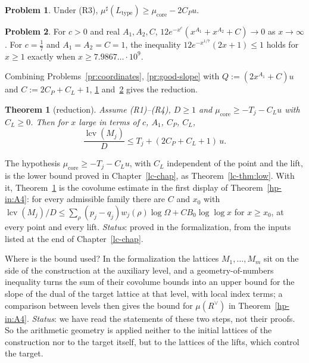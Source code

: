 \documentclass[reqno]{amsart}
\newcounter{chap}
\theoremstyle{definition}
\newtheorem{problem}{Problem}[section]
\theoremstyle{plain}
\newtheorem{theorem}{Theorem}[section]
\theoremstyle{remark}
\newcommand{\lcv}{\operatorname{lcv}}
\newcommand{\mus}{\mu^\sharp}
\newcommand{\Lt}{L_{\mathrm{type}}}
\begin{document}
\begin{problem}\label{pr:core-transfer}
Under (R3), \(\mus(\Lt) \ge \mu_{\mathrm{core}} - 2C_Pu\).
\end{problem}

\begin{problem}\label{pr:loss}
For \(c > 0\) and real \(A_1, A_2, C\), \(12e^{-x^c}(x^{A_1} + x^{A_2} + C) \to 0\) as \(x \to \infty\).  For \(c = \frac17\) and \(A_1 = A_2 = C = 1\), the inequality \(12e^{-x^{1/7}}(2x + 1) \le 1\) holds for \(x \ge 1\) exactly when \(x \ge 7.9867\ldots\cdot10^{9}\).
\end{problem}

Combining Problems~\ref{pr:coordinates}, \ref{pr:good-slope} with \(Q := (2x^{A_1} + C)u\) and \(C := 2C_P + C_L + 1\), \ref{pr:core-transfer} and~\ref{pr:loss} gives the reduction.

\begin{theorem}[reduction]\label{thm:reduction}
Assume (R1)--(R4), \(D \ge 1\) and \(\mu_{\mathrm{core}} \ge -T_j - C_Lu\) with \(C_L \ge 0\).  Then for \(x\) large in terms of \(c\), \(A_1\), \(C_P\), \(C_L\),
\[
  \frac{\lcv(M_j)}{D} \le T_j + (2C_P + C_L + 1)\,u .
\]
\end{theorem}

The hypothesis \(\mu_{\mathrm{core}} \ge -T_j - C_Lu\), with \(C_L\) independent of the point and the lift, is the lower bound proved in Chapter~\ref{lc-chap}, as Theorem~\ref{lc-thm:low}.  With it, Theorem~\ref{thm:reduction} is the covolume estimate in the first display of Theorem~\ref{hp-in:A4}: for every admissible family there are \(C\) and \(x_0\) with \(\lcv(M_j)/D \le \sum_\rho(p_j - q_j)w_j(\rho)\log\Omega + CB_0\log\log x\) for \(x \ge x_0\), at every point and every lift.  \emph{Status}: proved in the formalization, from the inputs listed at the end of Chapter~\ref{lc-chap}.

Where is the bound used?  In the formalization the lattices \(M_1, \dots, M_m\) sit on the side of the construction at the auxiliary level, and a geometry-of-numbers inequality turns the sum of their covolume bounds into an upper bound for the slope of the dual of the target lattice at that level, with local index terms; a comparison between levels then gives the bound for \(\mu(R^\vee)\) in Theorem~\ref{hp-in:A4}.  \emph{Status}: we have read the statements of these two steps, not their proofs.  So the arithmetic geometry is applied neither to the initial lattices of the construction nor to the target itself, but to the lattices of the lifts, which control the target.
\end{document}
